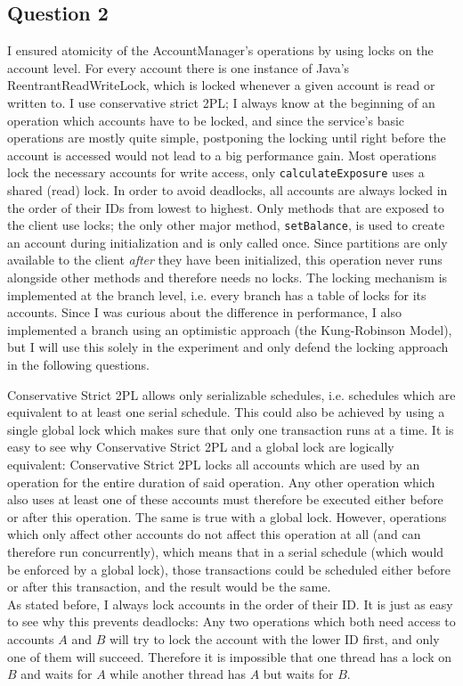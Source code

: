 \documentclass[12pt,a4paper,fleqn]{article}
\begin{document}
\subsection*{Question 2}
\label{sec:pq2}
I ensured atomicity of the AccountManager's operations by using locks on the account level. For every account there is one instance of Java's ReentrantReadWriteLock, which is locked whenever a given account is read or written to. I use conservative strict 2PL; I always know at the beginning of an operation which accounts have to be locked, and since the service's basic operations are mostly quite simple, postponing the locking until right before the account is accessed would not lead to a big performance gain. Most operations lock the necessary accounts for write access, only \texttt{calculateExposure} uses a shared (read) lock. In order to avoid deadlocks, all accounts are always locked in the order of their IDs from lowest to highest. Only methods that are exposed to the client use locks; the only other major method, \texttt{setBalance}, is used to create an account during initialization and is only called once. Since partitions are only available to the client \emph{after} they have been initialized, this operation never runs alongside other methods and therefore needs no locks. The locking mechanism is implemented at the branch level, i.e. every branch has a table of locks for its accounts. Since I was curious about the difference in performance, I also implemented a branch using an optimistic approach (the Kung-Robinson Model), but I will use this solely in the experiment and only defend the locking approach in the following questions.

Conservative Strict 2PL allows only serializable schedules, i.e. schedules which are equivalent to at least one serial schedule. This could also be achieved by using a single global lock which makes sure that only one transaction runs at a time. It is easy to see why Conservative Strict 2PL and a global lock are logically equivalent: Conservative Strict 2PL locks all accounts which are used by an operation for the entire duration of said operation. Any other operation which also uses at least one of these accounts must therefore be executed either before or after this operation. The same is true with a global lock. However, operations which only affect other accounts do not affect this operation at all (and can therefore run concurrently), which means that in a serial schedule (which would be enforced by a global lock), those transactions could be scheduled either before or after this transaction, and the result would be the same.  \\
As stated before, I always lock accounts in the order of their ID. It is just as easy to see why this prevents deadlocks: Any two operations which both need access to accounts $A$ and $B$ will try to lock the account with the lower ID first, and only one of them will succeed. Therefore it is impossible that one thread has a lock on $B$ and waits for $A$ while another thread has $A$ but waits for $B$.
\end{document}
